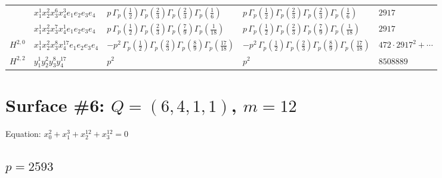 \documentclass[11pt]{article}
\begin{document}
\begin{table}[ht]
{\begin{tabular}{@{}lllll@{}}
 & $x_{1}^{1} x_{2}^{2} x_{3}^{6} x_{4}^{3}  e_{1} e_{2} e_{3} e_{4}$ & $p \, \Gamma_p \left( \frac{1}{2} \right) \Gamma_p \left( \frac{2}{3} \right) \Gamma_p \left( \frac{2}{3} \right) \Gamma_p \left( \frac{1}{6} \right)$ & $p \, \Gamma_p \left( \frac{1}{2} \right) \Gamma_p \left( \frac{2}{3} \right) \Gamma_p \left( \frac{2}{3} \right) \Gamma_p \left( \frac{1}{6} \right)$ & $2917$ \\
 & $x_{1}^{1} x_{2}^{2} x_{3}^{7} x_{4}^{1}  e_{1} e_{2} e_{3} e_{4}$ & $p \, \Gamma_p \left( \frac{1}{2} \right) \Gamma_p \left( \frac{2}{3} \right) \Gamma_p \left( \frac{7}{9} \right) \Gamma_p \left( \frac{1}{18} \right)$ & $p \, \Gamma_p \left( \frac{1}{2} \right) \Gamma_p \left( \frac{2}{3} \right) \Gamma_p \left( \frac{7}{9} \right) \Gamma_p \left( \frac{1}{18} \right)$ & $2917$ \\
\midrule
$H^{2,0}$ & $x_{1}^{1} x_{2}^{2} x_{3}^{8} x_{4}^{17}  e_{1} e_{2} e_{3} e_{4}$ & $- p^{2} \, \Gamma_p \left( \frac{1}{2} \right) \Gamma_p \left( \frac{2}{3} \right) \Gamma_p \left( \frac{8}{9} \right) \Gamma_p \left( \frac{17}{18} \right)$ & $- p^{2} \, \Gamma_p \left( \frac{1}{2} \right) \Gamma_p \left( \frac{2}{3} \right) \Gamma_p \left( \frac{8}{9} \right) \Gamma_p \left( \frac{17}{18} \right)$ & $472{\cdot}2917^{2}{+}\cdots$ \\
\midrule
$H^{2,2}$ & $y_{1}^{1} y_{2}^{2} y_{3}^{8} y_{4}^{17}$ & $p^{2} \,$ & $p^{2} \,$ & $8508889$ \\
\bottomrule
\end{tabular}
}
\renewcommand{\arraystretch}{1.0}
\end{table}

\newpage

\section*{Surface \#6: $Q=(6, 4, 1, 1)$, $m=12$}

Equation: $x_0^{2} + x_1^{3} + x_2^{12} + x_3^{12} = 0$

\subsection*{$p = 2593$}
\end{document}
